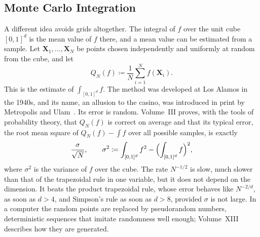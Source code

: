 \begin{table}
\end{table}

\subsection{Monte Carlo Integration}

A different idea avoids grids altogether. The integral of $f$ over the unit cube $[0,1]^d$ is the mean value of $f$ there, and a mean value can be estimated from a sample. Let $\mathbf X_1,\ldots,\mathbf X_N$ be points chosen independently and uniformly at random from the cube, and let
\[
Q_N(f)\coloneqq\frac1N\sum_{i=1}^Nf(\mathbf X_i).
\]
This is the  estimate of $\int_{[0,1]^d}f$. The method was developed at Los Alamos in the 1940s, and its name, an allusion to the casino, was introduced in print by Metropolis and Ulam~\cite{metropolis1949}. Its error is random. Volume~III proves, with the tools of probability theory, that $Q_N(f)$ is correct on average and that its typical error, the root mean square of $Q_N(f)-\int f$ over all possible samples, is exactly
\begin{equation}
\frac\sigma{\sqrt N},\qquad\sigma^2\coloneqq\int_{[0,1]^d}f^2-\Bigl(\int_{[0,1]^d}f\Bigr)^2 ,
\label{eq:monte-carlo-error}
\end{equation}
where $\sigma^2$ is the variance of $f$ over the cube. The rate $N^{-1/2}$ is slow, much slower than that of the trapezoidal rule in one variable, but it does not depend on the dimension. It beats the product trapezoidal rule, whose error behaves like $N^{-2/d}$, as soon as $d>4$, and Simpson's rule as soon as $d>8$, provided $\sigma$ is not large. In a computer the random points are replaced by pseudorandom numbers, deterministic sequences that imitate randomness well enough; Volume~XIII describes how they are generated.

